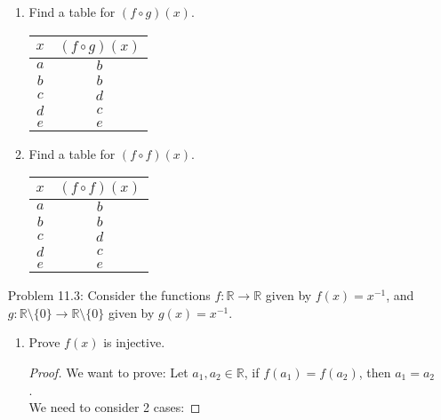 \documentclass{article}
\theoremstyle{claim}
\theoremstyle{definition}
\begin{document}
\begin{enumerate}
\begin{enumerate}
            \item Find a table for $(f \circ g)(x)$.
        \begin{center}
            \begin{tabular}{ |c | c| }
                \hline
                $x$ & $(f \circ g)(x)$\\
                \hline\hline
                $a$ & $b$\\
                \hline
                $b$ & $b$\\
                \hline
                $c$ & $d$\\
                \hline
                $d$ & $c$\\
                \hline
                $e$ & $e$\\ 
                \hline
            \end{tabular}
        \end{center}
            \item Find a table for $(f \circ f)(x)$.
        \begin{center}
            \begin{tabular}{ |c | c| }
                \hline
                $x$ & $(f \circ f)(x)$\\
                \hline\hline
                $a$ & $b$\\
                \hline
                $b$ & $b$\\
                \hline
                $c$ & $d$\\
                \hline
                $d$ & $c$\\
                \hline
                $e$ & $e$\\ 
                \hline
            \end{tabular}
        \end{center}
        \end{enumerate}
    \item[Problem 11.3:] Consider the functions $f: \mathbb{R} \rightarrow \mathbb{R}$ given by $f(x) = x^{-1}$, and $g : \mathbb{R} \setminus \{ 0 \} \rightarrow \mathbb{R} \setminus \{ 0 \}$ given by $g(x) = x^{-1}$.
        \begin{enumerate}
            \item Prove $f(x)$ is injective.
                \begin{proof}
                    We want to prove: Let $a_1, a_2 \in \mathbb{R}$, if $f(a_1) = f(a_2)$, then $a_1 = a_2$.\\
                    We need to consider 2 cases:

\end{proof}
\end{enumerate}
\end{enumerate}
\end{document}
